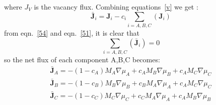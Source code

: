 \documentclass[12pt]{iiscthes}
\theoremstyle{definition}
\theoremstyle{definition}
\theoremstyle{remark}
\begin{document}
where $J_V$  is the vacancy flux.
Combining equations~\ref{v} we get : 
\begin{equation}\label{54}  
\mathbf{\bar J}_i = \mathbf{J}_i-c_i\sum_{i=A,B,C}\left(\mathbf{J}_i\right)
\end{equation}
from eqn.~\ref{54} and eqn.~\ref{51}, it is clear that
\begin{equation}\label{55}
\sum_{i=A,B,C}\left(\mathbf{\bar J}_i\right)= 0
\end{equation}  
so the net flux of each component A,B,C becomes:
\begin{eqnarray}\label{56}
\mathbf{\bar J}_A = -\left(1-c_A\right)M_A\nabla\mu_A + c_A M_B\nabla\mu_B + c_AM_C\nabla\mu_C\nonumber\\
\mathbf{\bar J}_B = -\left(1-c_B\right)M_B\nabla\mu_B + c_B M_A\nabla\mu_A + c_AM_C\nabla\mu_C\nonumber\\
\mathbf{\bar J}_C = -\left(1-c_C\right)M_C\nabla\mu_C + c_C M_A\nabla\mu_A + c_AM_B\nabla\mu_B
\end{eqnarray}
\end{document}
